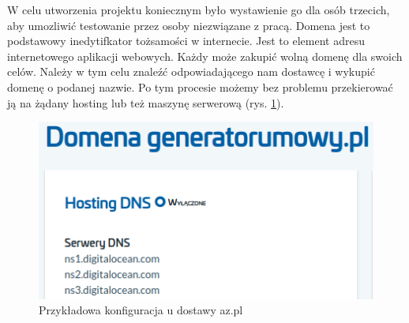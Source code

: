W celu utworzenia projektu koniecznym było wystawienie go dla osób trzecich, aby umozliwić testowanie przez osoby niezwiązane z pracą.
Domena jest to podstawowy inedytifkator tożsamości w internecie. Jest to element adresu internetowego aplikacji webowych.
Każdy może zakupić wolną domenę dla swoich celów. Należy w tym celu znaleźć odpowiadającego nam dostawcę i wykupić domenę o podanej nazwie.
Po tym procesie możemy bez problemu przekierować ją na żądany hosting lub też maszynę serwerową (rys. \ref{fig:domain}).

\begin{figure}[H]
    \centering
    \includegraphics[width=6in]{images/domain.png}
    \caption{Przykładowa konfiguracja u dostawy az.pl \label{fig:domain}}
\end{figure}